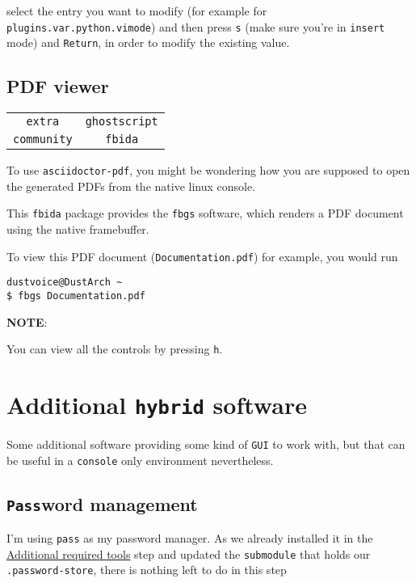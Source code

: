 \documentclass[9pt]{report}
\newcommand{\admonition}[2]{\textbf{#1}: {#2}}
\begin{document}
select the entry you want to modify (for example for \texttt{plugins.var.python.vimode}) and then press \texttt{s} (make sure you’re in \texttt{insert} mode) and \texttt{Return}, in order to modify the existing value.


\vfill\eject

\hypertarget{x-pdf-viewer}{\subsection{PDF viewer}}
\begin{center}
\begin{tabular}{|c|c|}
\hline
\texttt{extra} & \texttt{ghostscript} \\ 
\texttt{community} & \texttt{fbida} \\ 
\hline
\end{tabular}
\end{center}

To use \texttt{asciidoctor-pdf}, you might be wondering how you are supposed to open the generated PDFs from the native linux console.


This \texttt{fbida} package provides the \texttt{fbgs} software, which renders a PDF document using the native framebuffer.


To view this PDF document (\texttt{Documentation.pdf}) for example, you would run


\begin{verbatim}
dustvoice@DustArch ~
$ fbgs Documentation.pdf
\end{verbatim}

\admonition{NOTE}{You can view all the controls by pressing \texttt{h}.

}

\vfill\eject

\hypertarget{x-additional-hybrid-software}{\section{Additional \texttt{hybrid} software}}
Some additional software providing some kind of \texttt{GUI} to work with, but that can be useful in a \texttt{console} only environment nevertheless.



\vfill\eject

\hypertarget{x-password-management}{\subsection{\texttt{Pass}word management}}
I’m using \texttt{pass} as my password manager.
As we already installed it in the \hyperlink{additional-tools-setup-home}{Additional required tools} step and updated the \texttt{submodule} that holds our \texttt{.password-store}, there is nothing left to do in this step
\end{document}
